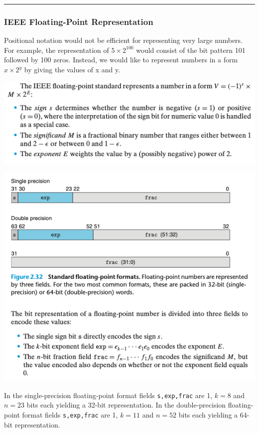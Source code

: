 \documentclass[11pt]{article}
\begin{document}
\noindent\rule{\textwidth}{0.5pt}

\subsubsection{IEEE Floating-Point Representation}
\label{sec:orgd1cc434}
Positional notation would not be efficient for representing very large numbers. For example, the representation of \(5 \times 2^{100}\) would consist of the bit pattern 101 followed by 100 zeros. Instead, we would like to represent numbers in a form \(x \times 2^y\) by giving the values of x and y.\\

\begin{center}
\includegraphics[width=.9\linewidth]{pics/ieee-floating-point-standard.png}
\end{center}

\begin{center}
\includegraphics[width=.9\linewidth]{pics/standard-floating-point-formats.png}
\end{center}

In the single-precision floating-point format fields \texttt{s,exp,frac} are 1, \(k=8\) and \(n=23\) bits each yielding a 32-bit representation. In the double-precision floating-point format fields \texttt{s,exp,frac} are 1, \(k=11\) and \(n=52\) bits each yielding a 64-bit representation.\\
\end{document}
